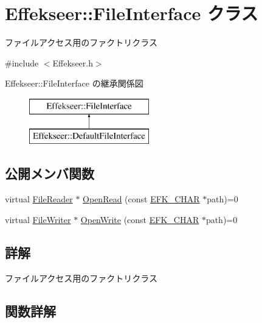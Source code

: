 \hypertarget{class_effekseer_1_1_file_interface}{}\section{Effekseer\+:\+:File\+Interface クラス}
\label{class_effekseer_1_1_file_interface}


ファイルアクセス用のファクトリクラス  




{\ttfamily \#include $<$Effekseer.\+h$>$}

Effekseer\+:\+:File\+Interface の継承関係図\begin{figure}[H]
\begin{center}
\leavevmode
\includegraphics[height=2.000000cm]{class_effekseer_1_1_file_interface}
\end{center}
\end{figure}
\subsection*{公開メンバ関数}
\begin{DoxyCompactItemize}
\item 
virtual \mbox{\hyperlink{class_effekseer_1_1_file_reader}{File\+Reader}} $\ast$ \mbox{\hyperlink{class_effekseer_1_1_file_interface_ad8744ad57226d9a2ce74f6ef6e2f9a41}{Open\+Read}} (const \mbox{\hyperlink{_effekseer_8h_aca7eb5de6dd019c19ac58ea35a193f2f}{E\+F\+K\+\_\+\+C\+H\+AR}} $\ast$path)=0
\item 
virtual \mbox{\hyperlink{class_effekseer_1_1_file_writer}{File\+Writer}} $\ast$ \mbox{\hyperlink{class_effekseer_1_1_file_interface_a1e60cb81a5cae39b37e44570ef693d91}{Open\+Write}} (const \mbox{\hyperlink{_effekseer_8h_aca7eb5de6dd019c19ac58ea35a193f2f}{E\+F\+K\+\_\+\+C\+H\+AR}} $\ast$path)=0
\end{DoxyCompactItemize}


\subsection{詳解}
ファイルアクセス用のファクトリクラス 

\subsection{関数詳解}
\mbox{\label{class_effekseer_1_1_file_interface_ad8744ad57226d9a2ce74f6ef6e2f9a41}} 
